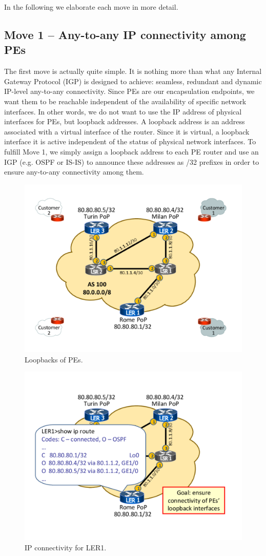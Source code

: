 \documentclass{article}
\begin{document}
In the following we elaborate each move in more detail.

\subsection{Move 1 -- Any-to-any IP connectivity among PEs}
The first move is actually quite simple. It is nothing more than what any 
Internal Gateway Protocol (IGP) is designed to achieve: seamless, redundant and 
dynamic IP-level any-to-any connectivity. Since PEs are our encapsulation 
endpoints, we want them to be reachable independent of the availability of 
specific network interfaces. In other words, we do not want to use the IP 
address of physical interfaces for PEs, but loopback addresses. A loopback address is an address associated with a virtual 
interface of the router. Since it is virtual, a loopback interface it is active 
independent of the status of physical network interfaces. To fulfill Move 1, we 
simply assign a loopback address to each PE router and use an IGP (e.g. OSPF or 
IS-IS) 
to announce these addresses as /32 prefixes in order to ensure any-to-any connectivity among them. 

\begin{figure}
\centering
 \includegraphics[trim=0cm 1.5cm 0cm 1.5cm, clip=true, width=0.7\columnwidth]{figures/mpls-slides-5}
 \caption{Loopbacks of PEs.}
 \label{fig:mpls-slides-5}
\end{figure}

\begin{figure}
\centering
 \includegraphics[trim=0cm 1.5cm 0cm 1.5cm, clip=true, width=0.7\columnwidth]{figures/mpls-slides-8}
 \caption{IP connectivity for LER1.}
 \label{fig:mpls-slides-8}
\end{figure}
\end{document}
